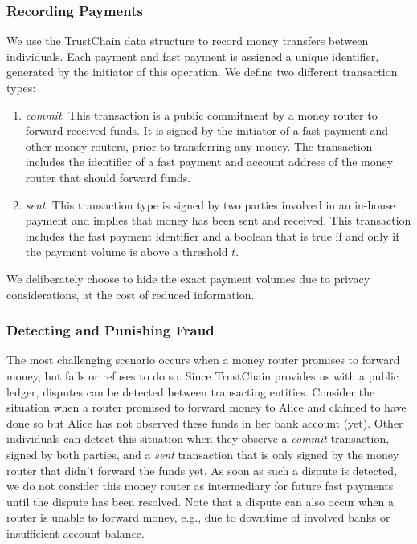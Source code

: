 \subsubsection*{Recording Payments}
We use the TrustChain data structure to record money transfers between individuals.
Each payment and fast payment is assigned a unique identifier, generated by the initiator of this operation.
We define two different transaction types:
\begin{enumerate}
	\item \emph{commit}: This transaction is a public commitment by a money router to forward received funds.
	It is signed by the initiator of a fast payment and other money routers, prior to transferring any money. The transaction includes the identifier of a fast payment and account address of the money router that should forward funds.
	\item \emph{sent}: This transaction type is signed by two parties involved in an in-house payment and implies that money has been sent and received. This transaction includes the fast payment identifier and a boolean that is true if and only if the payment volume is above a threshold $ t $.
\end{enumerate}
We deliberately choose to hide the exact payment volumes due to privacy considerations, at the cost of reduced information.

\subsubsection*{Detecting and Punishing Fraud}
The most challenging scenario occurs when a money router promises to forward money, but fails or refuses to do so.
Since TrustChain provides us with a public ledger, disputes can be detected between transacting entities.
Consider the situation when a router promised to forward money to Alice and claimed to have done so but Alice has not observed these funds in her bank account (yet).
Other individuals can detect this situation when they observe a \emph{commit} transaction, signed by both parties, and a \emph{sent} transaction that is only signed by the money router that didn't forward the funds yet.
As soon as such a dispute is detected, we do not consider this money router as intermediary for future fast payments until the dispute has been resolved.
Note that a dispute can also occur when a router is unable to forward money, e.g., due to downtime of involved banks or insufficient account balance.

